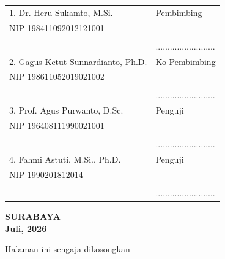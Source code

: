 \begin{center}
\noindent
\begin{tabularx}{\textwidth}{X l}
	1. Dr. Heru Sukamto, M.Si.     & Pembimbing \\
	NIP 198411092012121001       &  \\
	&  \\
	&.........................  \\
	2. Gagus Ketut Sunnardianto, Ph.D.   & Ko-Pembimbing \\
	NIP 198611052019021002 	& \\
	&  \\
	& ......................... \\
	3. Prof. Agus Purwanto, D.Sc. & Penguji \\
	NIP 196408111990021001     & \\
        &  \\
	& ......................... \\
	4. Fahmi Astuti, M.Si., Ph.D. & Penguji \\
	NIP 1990201812014      & \\
        &  \\
	& ......................... \\
\end{tabularx}
\endgroup
  \begin{center}
	\textbf{SURABAYA\\Juli, 2026}
\end{center}
\end{center}

\newpage
\thispagestyle{empty}
\vspace*{\fill}
    \begin{center}
	Halaman ini sengaja dikosongkan
    \end{center}
\vspace*{\fill}
\pagebreak

